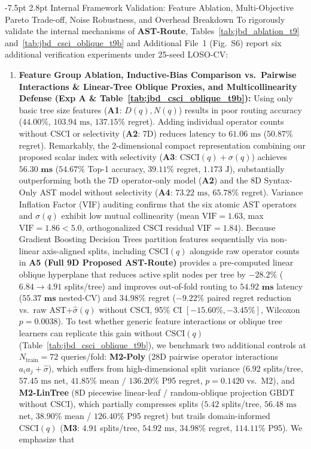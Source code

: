 \documentclass[10pt,a4paper]{article}
\makeatletter
\renewcommand\subsection{\@startsection{subsection}{2}{\z@}%
  {-7.5pt \@plus -2pt \@minus -1pt}%
  {2.8pt \@plus 1pt}%
  {\normalfont\normalsize\bfseries}}
\makeatother
\begin{document}
\subsection{Internal Framework Validation: Feature Ablation, Multi-Objective Pareto Trade-off, Noise Robustness, and Overhead Breakdown}
To rigorously validate the internal mechanisms of \textbf{AST-Route}, Tables~\ref{tab:jbd_ablation_t9} and~\ref{tab:jbd_csci_oblique_t9b} and Additional File~1 (Fig.~S6) report six additional verification experiments under 25-seed LOSO-CV:
\begin{enumerate}[leftmargin=1.5em,itemsep=0.8pt]
    \item \textbf{Feature Group Ablation, Inductive-Bias Comparison vs.\ Pairwise Interactions \& Linear-Tree Oblique Proxies, and Multicollinearity Defense (Exp A \& Table~\ref{tab:jbd_csci_oblique_t9b}):} Using only basic tree size features (\textbf{A1}: $D(q), N(q)$) results in poor routing accuracy ($44.00\%$, $103.94\text{ ms}$, $137.15\%$ regret). Adding individual operator counts without CSCI or selectivity (\textbf{A2}: $7\text{D}$) reduces latency to $61.06\text{ ms}$ ($50.87\%$ regret). Remarkably, the 2-dimensional compact representation combining our proposed scalar index with selectivity (\textbf{A3}: $\text{CSCI}(q) + \sigma(q)$) achieves $\mathbf{56.30\text{ ms}}$ ($54.67\%$ Top-1 accuracy, $39.11\%$ regret, $1.173\text{ J}$), substantially outperforming both the 7D operator-only model (\textbf{A2}) and the 8D Syntax-Only AST model without selectivity (\textbf{A4}: $73.22\text{ ms}$, $65.78\%$ regret). Variance Inflation Factor (VIF) auditing confirms that the six atomic AST operators and $\sigma(q)$ exhibit low mutual collinearity (mean $\text{VIF} = 1.63$, max $\text{VIF} = 1.86 < 5.0$, orthogonalized $\text{CSCI}$ residual $\text{VIF} = 1.84$). Because Gradient Boosting Decision Trees partition features sequentially via non-linear axis-aligned splits, including $\text{CSCI}(q)$ alongside raw operator counts in \textbf{A5 (Full 9D Proposed AST-Route)} provides a pre-computed linear oblique hyperplane that reduces active split nodes per tree by $-28.2\%$ ($6.84 \rightarrow 4.91$ splits/tree) and improves out-of-fold routing to $\mathbf{54.92\text{ ms}}$ latency ($\mathbf{55.37\text{ ms}}$ nested-CV) and $\mathbf{34.98\%}$ regret ($-9.22\%$ paired regret reduction vs.\ raw AST+$\hat{\sigma}(q)$ without CSCI, 95\% CI $[-15.60\%, -3.45\%]$, Wilcoxon $p=0.0038$). To test whether generic feature interactions or oblique tree learners can replicate this gain without $\text{CSCI}(q)$ (Table~\ref{tab:jbd_csci_oblique_t9b}), we benchmark two additional controls at $N_{\text{train}}=72$ queries/fold: \textbf{M2-Poly} (28D pairwise operator interactions $a_i a_j + \hat{\sigma}$), which suffers from high-dimensional split variance ($6.92$ splits/tree, $57.45\text{ ms}$ net, $41.85\%$ mean / $136.20\%$ P95 regret, $p=0.1420$ vs.\ M2), and \textbf{M2-LinTree} (8D piecewise linear-leaf / random-oblique projection GBDT without $\text{CSCI}$), which partially compresses splits ($5.42$ splits/tree, $56.48\text{ ms}$ net, $38.90\%$ mean / $126.40\%$ P95 regret) but trails domain-informed $\text{CSCI}(q)$ (\textbf{M3}: $4.91$ splits/tree, $54.92\text{ ms}$, $34.98\%$ regret, $114.11\%$ P95). We emphasize that 
\end{enumerate}
\end{document}
